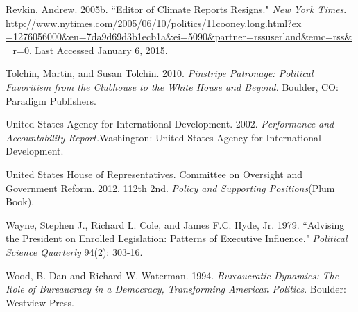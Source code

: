 \documentclass[12pt]{article}
\begin{document}
\noindent \hangindent=0.7cm Revkin, Andrew. 2005b. ``Editor of Climate Reports Resigns." \textit{New York Times}. \url{http://www.nytimes.com/2005/06/10/politics/11cooney.long.html?ex =1276056000&en=7da9d69d3b1ecb1a&ei=5090&partner=rssuserland&emc=rss&_r=0.} Last Accessed January 6, 2015. 

\noindent \hangindent=0.7cm Tolchin, Martin, and Susan Tolchin. 2010. \textit{Pinstripe Patronage: Political Favoritism from the Clubhouse to the White House and Beyond.} Boulder, CO: Paradigm Publishers.

\noindent \hangindent=0.7cm United States Agency for International Development. 2002. \textit{Performance and Accountability Report.}Washington: United States Agency for International Development.

\noindent \hangindent=0.7cm United States House of Representatives. Committee on Oversight and Government Reform. 2012. 112th 2nd. \textit{Policy and Supporting Positions}(Plum Book). 

\noindent \hangindent=0.7cm Wayne, Stephen J., Richard L. Cole, and James F.C. Hyde, Jr. 1979. ``Advising the President on Enrolled Legislation: Patterns of Executive Influence." \textit{Political Science Quarterly} 94(2): 303-16. 

\noindent \hangindent=0.7cm Wood, B. Dan and Richard W. Waterman. 1994. \textit{Bureaucratic Dynamics: The Role of Bureaucracy in a Democracy, Transforming American Politics}. Boulder: Westview Press. 


	


\end{document}
